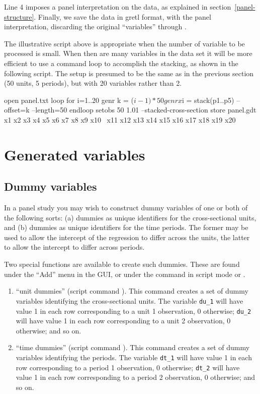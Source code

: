 Line 4 imposes a panel interpretation on the data, as explained in
section~\ref{panel-structure}.  Finally, we save the data in gretl
format, with the panel interpretation, discarding the original
``variables''  through .

The illustrative script above is appropriate when the number of
variable to be processed is small.  When then are many variables in
the data set it will be more efficient to use a command loop to
accomplish the stacking, as shown in the following script.  The setup
is presumed to be the same as in the previous section (50 units, 5
periods), but with 20 variables rather than 2.

\begin{code}
    open panel.txt
    loop for i=1..20
      genr k = ($i - 1) * 50
      genr x$i = stack(p1..p5) --offset=k --length=50
    endloop
    setobs 50 1.01 --stacked-cross-section
    store panel.gdt x1 x2 x3 x4 x5 x6 x7 x8 x9 x10 \
      x11 x12 x13 x14 x15 x16 x17 x18 x19 x20
\end{code}

\section{Generated variables}
\label{panel-genr}

\subsection{Dummy variables}
\label{dummies}

In a panel study you may wish to construct dummy variables of one or
both of the following sorts: (a) dummies as unique identifiers for the
cross-sectional units, and (b) dummies as unique identifiers for the
time periods.  The former may be used to allow the intercept of the
regression to differ across the units, the latter to allow the
intercept to differ across periods.

Two special functions are available to create such dummies.  These are
found under the ``Add'' menu in the GUI, or under the \cmd{genr}
command in script mode or \app{gretlcli}.

\begin{enumerate}
\item ``unit dummies'' (script command ).  This
  command creates a set of dummy variables identifying the
  cross-sectional units.  The variable \verb+du_1+ will have value 1
  in each row corresponding to a unit 1 observation, 0 otherwise;
  \verb+du_2+ will have value 1 in each row corresponding to a unit 2
  observation, 0 otherwise; and so on.
\item ``time dummies'' (script command ).  This
  command creates a set of dummy variables identifying the periods.
  The variable \verb+dt_1+ will have value 1 in each row
  corresponding to a period 1 observation, 0 otherwise; \verb+dt_2+
  will have value 1 in each row corresponding to a period 2
  observation, 0 otherwise; and so on.
\end{enumerate}

